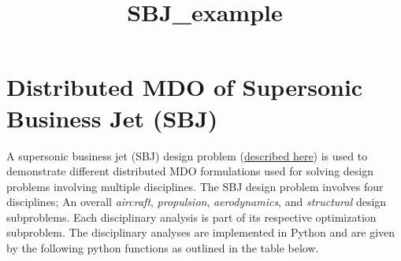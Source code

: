\documentclass[11pt]{article}
\title{SBJ\_example}
\begin{document}
    
    \maketitle
    
    

    
    \hypertarget{distributed-mdo-of-supersonic-business-jet-sbj}{%
\section{Distributed MDO of Supersonic Business Jet
(SBJ)}\label{distributed-mdo-of-supersonic-business-jet-sbj}}

A supersonic business jet (SBJ) design problem
(\href{https://github.com/MECH559/MECH_559_material/blob/master/Books/Articles/SBJ_BLISS.pdf}{described
here}) is used to demonstrate different distributed MDO formulations
used for solving design problems involving multiple disciplines. The SBJ
design problem involves four disciplines; An overall \emph{aircraft},
\emph{propulsion}, \emph{aerodynamics}, and \emph{structural} design
subproblems. Each disciplinary analysis is part of its respective
optimization subproblem. The disciplinary analyses are implemented in
Python and are given by the following python functions as outlined in
the table below.
\end{document}
